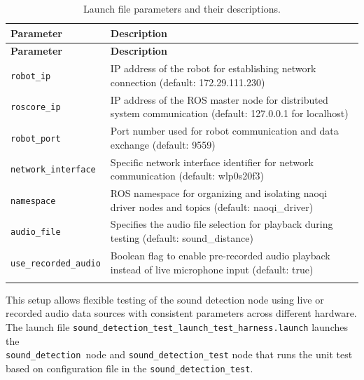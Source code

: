 \documentclass{CSSRforAfrica}
\begin{document}
\begin{longtable}{| l | p{11cm} |}
	\hline
	\rowcolor{blue!20}
	\textbf{Parameter} & \textbf{Description} \\
	\hline
	\endfirsthead
	
	\hline
	\rowcolor{blue!20}
	\textbf{Parameter} & \textbf{Description} \\
	\hline
	\endhead
	
	\texttt{robot\_ip} & IP address of the robot for establishing network connection (default: 172.29.111.230) \\
	\hline
	\texttt{roscore\_ip} & IP address of the ROS master node for distributed system communication (default: 127.0.0.1 for localhost) \\
	\hline
	\texttt{robot\_port} & Port number used for robot communication and data exchange (default: 9559) \\
	\hline
	\texttt{network\_interface} & Specific network interface identifier for network communication (default: wlp0s20f3) \\
	\hline
	\texttt{namespace} & ROS namespace for organizing and isolating naoqi driver nodes and topics (default: naoqi\_driver) \\
	\hline
	\texttt{audio\_file} & Specifies the audio file selection for playback during testing (default: sound\_distance) \\
	\hline
	\texttt{use\_recorded\_audio} & Boolean flag to enable pre-recorded audio playback instead of live microphone input (default: true) \\
	\hline
	\caption{Launch file parameters and their descriptions.}
	\label{tab:launch_parameters}
\end{longtable}

This setup allows flexible testing of the sound detection node using live or recorded audio data sources with consistent parameters across different hardware.\\
The launch file \texttt{sound\_detection\_test\_launch\_test\_harness.launch} launches the \\ \texttt{sound\_detection }node and \texttt{sound\_detection\_test} node that runs the unit test based on configuration file in the \texttt{sound\_detection\_test}.

\newpage
\end{document}
